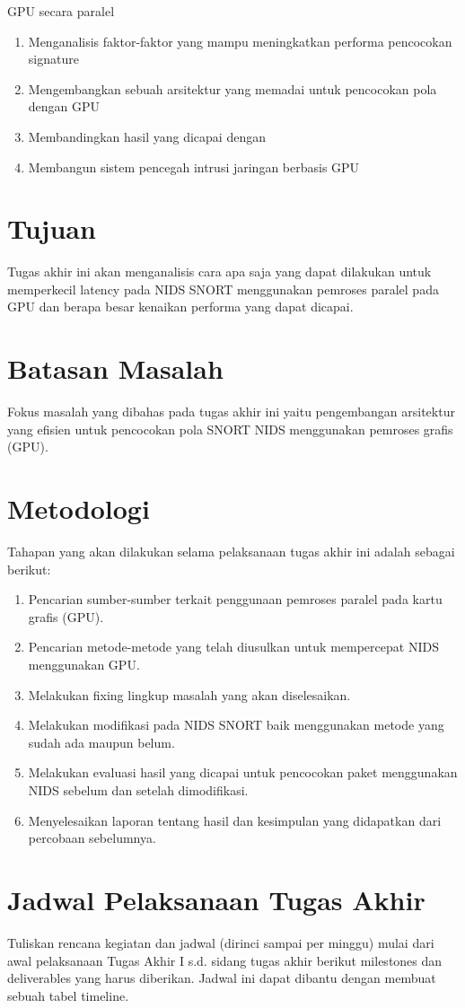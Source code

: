 GPU secara paralel

\begin{enumerate}
    \item Menganalisis faktor-faktor yang mampu meningkatkan performa pencocokan signature
    \item Mengembangkan sebuah arsitektur yang memadai untuk pencocokan pola dengan GPU
    \item Membandingkan hasil yang dicapai dengan
    \item Membangun sistem pencegah intrusi jaringan berbasis GPU
\end{enumerate}

\section{Tujuan}

Tugas akhir ini akan menganalisis cara apa saja yang dapat dilakukan untuk memperkecil latency pada NIDS SNORT menggunakan pemroses paralel pada GPU dan berapa besar kenaikan performa yang dapat dicapai.

\section{Batasan Masalah}

Fokus masalah yang dibahas pada tugas akhir ini yaitu pengembangan arsitektur yang efisien untuk pencocokan pola SNORT NIDS menggunakan pemroses grafis (GPU).

\section{Metodologi}

Tahapan yang akan dilakukan selama pelaksanaan tugas akhir ini adalah sebagai berikut:

\begin{enumerate}
    \item Pencarian sumber-sumber terkait penggunaan pemroses paralel pada kartu grafis (GPU).
    \item Pencarian metode-metode yang telah diusulkan untuk mempercepat NIDS menggunakan GPU.
    \item Melakukan fixing lingkup masalah yang akan diselesaikan.
    \item Melakukan modifikasi pada NIDS SNORT baik menggunakan metode yang sudah ada maupun belum.
    \item Melakukan evaluasi hasil yang dicapai untuk pencocokan paket menggunakan NIDS sebelum dan setelah dimodifikasi.
    \item Menyelesaikan laporan tentang hasil dan kesimpulan yang didapatkan dari percobaan sebelumnya.
\end{enumerate}


\section{Jadwal Pelaksanaan Tugas Akhir}

Tuliskan rencana kegiatan dan jadwal (dirinci sampai per minggu) mulai dari awal pelaksanaan Tugas Akhir I s.d. sidang tugas akhir berikut milestones dan deliverables yang harus diberikan. Jadwal ini dapat dibantu dengan membuat sebuah tabel timeline.
